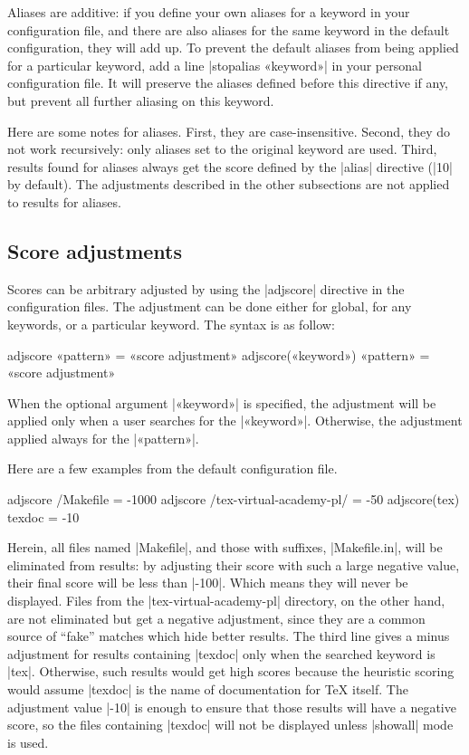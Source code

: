 \documentclass[draft]{texdoc-doc}
\begin{document}
Aliases are additive: if you define your own aliases for a keyword in your
configuration file, and there are also aliases for the same keyword in the
default configuration, they will add up. To prevent the default aliases from
being applied for a particular keyword, add a line |stopalias «keyword»| in
your personal configuration file. It will preserve the aliases defined before
this directive if any, but prevent all further aliasing on this keyword.

Here are some notes for aliases. First, they are case-insensitive. Second, they
do not work recursively: only aliases set to the original keyword are used.
Third, results found for aliases always get the score defined by the |alias|
directive (|10| by default). The adjustments described in the other subsections
are not applied to results for aliases.

\subsection{Score adjustments}
\label{sec:score}

Scores can be arbitrary adjusted by using the |adjscore| directive in the
configuration files. The adjustment can be done either for global, \ie for any
keywords, or a particular keyword. The syntax is as follow:
%
\begin{htcode}
adjscore «pattern» = «score adjustment»
adjscore(«keyword») «pattern» = «score adjustment»
\end{htcode}
%
When the optional argument |«keyword»| is specified, the adjustment will be
applied only when a user searches for the |«keyword»|. Otherwise, the
adjustment applied always for the |«pattern»|.

Here are a few examples from the default configuration file.

\begin{htcode}
adjscore /Makefile = -1000
adjscore /tex-virtual-academy-pl/ = -50
adjscore(tex) texdoc = -10
\end{htcode}
%
Herein, all files named |Makefile|, and those with suffixes, \eg |Makefile.in|,
will be eliminated from results: by adjusting their score with such a large
negative value, their final score will be less than |-100|. Which means they
will never be displayed. Files from the |tex-virtual-academy-pl| directory, on
the other hand, are not eliminated but get a negative adjustment, since they
are a common source of ``fake'' matches which hide better results. The third
line gives a minus adjustment for results containing |texdoc| only when the
searched keyword is |tex|. Otherwise, such results would get high scores
because the heuristic scoring would assume |texdoc| is the name of
documentation for {\TeX} itself. The adjustment value |-10| is enough to ensure
that those results will have a negative score, so the files containing |texdoc|
will not be displayed unless |showall| mode is used.
\end{document}
